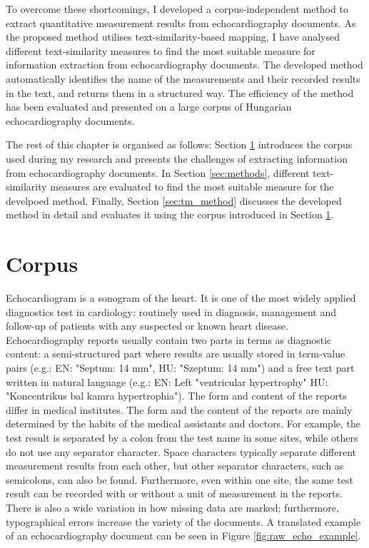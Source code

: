 \vspace{0.5cm}
To overcome these shortcomings, I developed a corpus-independent method to extract quantitative measurement results from echocardiography documents. As the proposed method utilises text-similarity-based mapping, I have analysed different text-similarity measures to find the most suitable measure for information extraction from echocardiography documents. The developed method automatically identifies the name of the measurements and their recorded results in the text, and returns them in a structured way. The efficiency of the method has been evaluated and presented on a large corpus of Hungarian echocardiography documents.

\vspace{0.5cm}
The rest of this chapter is organised as follows: Section \ref{sec:corpus} introduces the corpus used during my research and presents the challenges of extracting information from echocardiography documents. In Section \ref{sec:methods}, different text-similarity measures are evaluated to find the most suitable measure for the develpoed method. Finally, Section \ref{sec:tm_method} discusses the developed method in detail and evaluates it using the corpus introduced in Section \ref{sec:corpus}.

\section{Corpus}
\label{sec:corpus}

Echocardiogram is a sonogram of the heart. It is one of the most widely applied diagnostics test in cardiology: routinely used in diagnosis, management and follow-up of patients with any suspected or known heart disease. Echocardiography reports usually contain two parts in terms as diagnostic content: a semi-structured part where results are usually stored in term-value pairs (e.g.: EN: "Septum: 14 mm", HU: "Szeptum: 14 mm") and a free text part written in natural language (e.g.: EN: Left "ventricular hypertrophy" HU: "Koncentrikus bal kamra hypertrophia"). The form and content of the reports differ in medical institutes. The form and the content of the reports are mainly determined by the habits of the medical assistants and doctors. For example, the test result is separated by a colon from the test name in some sites, while others do not use any separator character. Space characters typically separate different measurement results from each other, but other separator characters, such as semicolons, can also be found. Furthermore, even within one site, the same test result can be recorded with or without a unit of measurement in the reports. There is also a wide variation in how missing data are marked; furthermore, typographical errors increase the variety of the documents. A translated example of an echocardiography document can be seen in Figure \ref{fig:raw_echo_example}.

